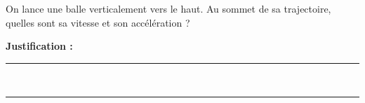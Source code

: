 On lance une balle verticalement vers le haut. Au sommet de sa trajectoire, quelles sont sa vitesse et son accélération ?

\choices

\noindent\textbf{Justification :} \hrulefill \\[2.5ex]
\rule{\linewidth}{0.4pt} \\[2.5ex]
\rule{\linewidth}{0.4pt}
\vfill
